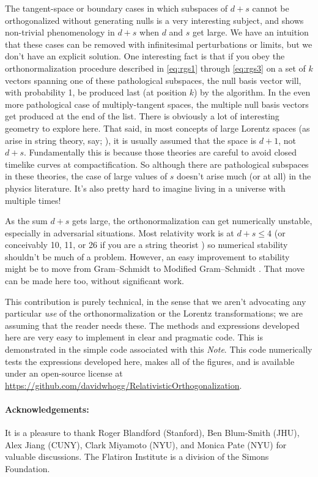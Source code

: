 \documentclass{article}
\newcommand{\plus}{\!+\!} %
\newcommand{\documentname}{\textsl{Note}}
\begin{document}
The tangent-space or boundary cases in which subspaces of $d\plus s$ cannot be orthogonalized without generating nulls is a very interesting subject, and shows non-trivial phenomenology in $d+s$ when $d$ and $s$ get large.
We have an intuition that these cases can be removed with infinitesimal perturbations or limits, but we don't have an explicit solution.
One interesting fact is that if you obey the orthonormalization procedure described in \eqref{eq:rgs1} through \eqref{eq:rgs3} on a set of $k$ vectors spanning one of these pathological subspaces, the null basis vector will, with probability 1, be produced last (at position $k$) by the algorithm.
In the even more pathological case of multiply-tangent spaces, the multiple null basis vectors get produced at the end of the list.
There is obviously a lot of interesting geometry to explore here.
That said, in most concepts of large Lorentz spaces (as arise in string theory, say; \cite{strings}), it is usually assumed that the space is $d+1$, not $d+s$.
Fundamentally this is because those theories are careful to avoid closed timelike curves at compactification.
So although there are pathological subspaces in these theories, the case of large values of $s$ doesn't arise much (or at all) in the physics literature.
It's also pretty hard to imagine living in a universe with multiple times!

As the sum $d+s$ gets large, the orthonormalization can get numerically unstable, especially in adversarial situations.
Most relativity work is at $d+s\leq 4$ (or conceivably 10, 11, or 26 if you are a string theorist \cite{strings}) so numerical stability shouldn't be much of a problem.
However, an easy improvement to stability might be to move from Gram--Schmidt to Modified Gram--Schmidt \cite{modifiedgramschmidt}.
That move can be made here too, without significant work.

This contribution is purely technical, in the sense that we aren't advocating any particular \emph{use} of the orthonormalization or the Lorentz transformations; we are assuming that the reader needs these.
The methods and expressions developed here are very easy to implement in clear and pragmatic code.
This is demonstrated in the simple code associated with this \documentname.
This code numerically tests the expressions developed here, makes all of the figures, and is available under an open-source license at \url{https://github.com/davidwhogg/RelativisticOrthogonalization}.

\paragraph{Acknowledgements:}
It is a pleasure to thank
  Roger Blandford (Stanford),
  Ben Blum-Smith (JHU),
  Alex Jiang (CUNY),
  Clark Miyamoto (NYU), and
  Monica Pate (NYU)
for valuable discussions.
The Flatiron Institute is a division of the Simons Foundation.

\raggedright


\end{document}
